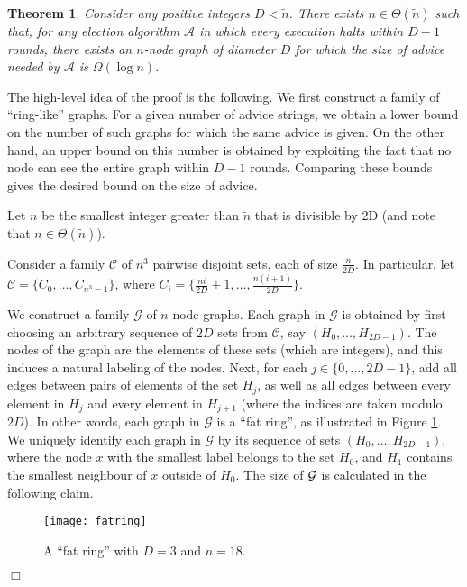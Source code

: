 \documentclass[11pt]{article}
\newtheorem{theorem}{Theorem}[section]
\newcommand{\qed}{\hfill $\Box$ \bigbreak}
\newenvironment{proof}{\noindent {\bf Proof.}}{\qed}
\newcommand{\givensize}{\ensuremath{\tilde{n}}}
\newcommand{\givendiameter}{\ensuremath{D}}
\begin{document}
\begin{theorem}
Consider any positive integers $\givendiameter < \givensize $. There exists $n \in \Theta( \givensize )$ such that, for any election algorithm $\mathcal{A}$ in which every execution halts within $D-1$ rounds, there exists an $n$-node graph of diameter $D$ for which the size of advice needed by $\mathcal{A}$ is $\Omega(\log{n})$.
\end{theorem}
\begin{proof}
The high-level idea of the proof is the following. We first construct a family of ``ring-like'' graphs.
For a given number of advice strings, we obtain a lower bound on the number of such graphs for which the same advice is given.
On the other hand, an upper bound on this number is obtained by exploiting the fact that no node can see the entire graph within $D-1$ rounds. Comparing these bounds gives the desired bound on the size of advice.  


Let $n$ be the smallest integer greater than $\givensize$ that is divisible by 2D (and note that $n \in \Theta( \givensize )$).


Consider a family $\mathcal{C}$ of $n^3$ pairwise disjoint sets, each of size $\frac{n}{2D}$. In particular, let 
$\mathcal{C}= \{C_0,\ldots,C_{n^3-1}\}$, where
$C_i=\{\frac{ni}{2D}+1,\ldots,\frac{n(i+1)}{2D}\}$.

We construct a family $\mathcal{G}$ of $n$-node graphs. Each graph in $\mathcal{G}$ is obtained by first choosing an arbitrary sequence of $2D$ sets from $\mathcal{C}$, say $(H_0,\ldots,H_{2D-1})$. The nodes of the graph are the elements of these sets (which are integers),
and this induces a natural labeling of the nodes. Next,
for each $j \in \{0,\ldots,2D-1\}$, add all edges between pairs of elements of the set $H_j$, as well as all edges between every element in $H_j$ and 
every element in $H_{j+1}$ (where the indices are taken modulo $2D$). 
In other words, each graph in $\mathcal{G}$ is a ``fat ring'', as illustrated in Figure \ref{fatring}. 
We uniquely identify each graph in $\mathcal{G}$ by its sequence of sets $(H_0,\ldots,H_{2D-1})$, where the node $x$ with the smallest label belongs to the set $H_0$,
 and $H_1$ contains the smallest neighbour of $x$ outside of $H_0$. The size of $\cal G$ is calculated in the following claim.
 
\begin{figure}[!ht]
\begin{center}
\texttt{[image: fatring]}
\end{center}
\caption{A ``fat ring'' with $D=3$ and $n=18$.}
\label{fatring}
\end{figure}


\end{proof}
\end{document}
